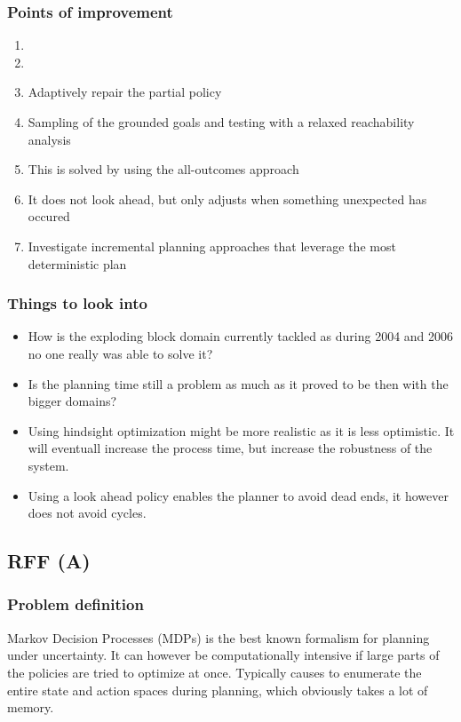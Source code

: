 \documentclass[runningheads,a4paper]{llncs}
\begin{document}
\subsubsection{Points of improvement}
\begin{enumerate}
	\item
	\item
	\item Adaptively repair the partial policy
	\item Sampling of the grounded goals and testing with a relaxed reachability analysis
	\item This is solved by using the all-outcomes approach
	\item It does not look ahead, but only adjusts when something unexpected has occured

	\item Investigate incremental planning approaches that leverage the most deterministic plan
\end{enumerate}

\subsubsection{Things to look into}
\begin{itemize}
	\item How is the exploding block domain currently tackled as during 2004 and 2006 no one really was able to solve it?
	\item Is the planning time still a problem as much as it proved to be then with the bigger domains?
	\item Using hindsight optimization might be more realistic as it is less optimistic. It will eventuall increase the process time, but increase the robustness of the system.
	\item Using a look ahead policy enables the planner to avoid dead ends, it however does not avoid cycles.
\end{itemize}

\subsection{RFF (A)}

\subsubsection{Problem definition}

Markov Decision Processes (MDPs) is the best known formalism for planning under
uncertainty. It can however be computationally intensive if large parts of the
policies are tried to optimize at once. Typically causes to enumerate the
entire state and action spaces during planning, which obviously takes a lot of
memory.
\end{document}
